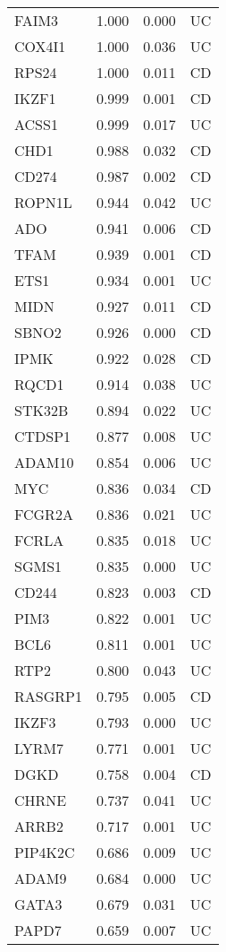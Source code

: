 \begin{center}
\begin{longtable}{| L{5cm} | R{1.2cm} | R{1cm} | L{1.5cm} |}
FAIM3 & 1.000 & 0.000 & UC \\ 
COX4I1 & 1.000 & 0.036 & UC \\ 
RPS24 & 1.000 & 0.011 & CD \\ 
IKZF1 & 0.999 & 0.001 & CD \\                              
ACSS1 & 0.999 & 0.017 & UC \\ 
CHD1 & 0.988 & 0.032 & CD \\ 
CD274 & 0.987 & 0.002 & CD \\ 
ROPN1L & 0.944 & 0.042 & UC \\ 
ADO & 0.941 & 0.006 & CD \\ 
 TFAM & 0.939 & 0.001 & CD \\ 
 ETS1 & 0.934 & 0.001 & UC \\ 
 MIDN & 0.927 & 0.011 & CD \\ 
 SBNO2 & 0.926 & 0.000 & CD \\ 
 IPMK & 0.922 & 0.028 & CD \\ 
 RQCD1 & 0.914 & 0.038 & UC \\ 
 STK32B & 0.894 & 0.022 & UC \\ 
 CTDSP1 & 0.877 & 0.008 & UC \\ 
 ADAM10 & 0.854 & 0.006 & UC \\ 
 MYC & 0.836 & 0.034 & CD \\ 
 FCGR2A & 0.836 & 0.021 & UC \\ 
 FCRLA & 0.835 & 0.018 & UC \\ 
 SGMS1 & 0.835 & 0.000 & UC \\ 
 CD244 & 0.823 & 0.003 & CD \\ 
 PIM3 & 0.822 & 0.001 & UC \\ 
 BCL6 & 0.811 & 0.001 & UC \\ 
 RTP2 & 0.800 & 0.043 & UC \\ 
 RASGRP1 & 0.795 & 0.005 & CD \\ 
 IKZF3 & 0.793 & 0.000 & UC \\ 
 LYRM7 & 0.771 & 0.001 & UC \\ 
 DGKD & 0.758 & 0.004 & CD \\ 
 CHRNE & 0.737 & 0.041 & UC \\ 
 ARRB2 & 0.717 & 0.001 & UC \\ 
 PIP4K2C & 0.686 & 0.009 & UC \\ 
 ADAM9 & 0.684 & 0.000 & UC \\ 
 GATA3 & 0.679 & 0.031 & UC \\ 
 PAPD7 & 0.659 & 0.007 & UC \\ 

\end{longtable}
\end{center}

